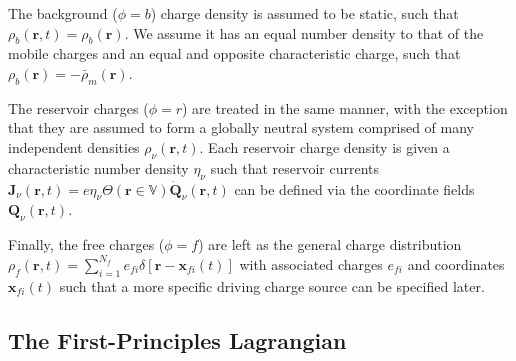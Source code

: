 \documentclass{article}
\begin{document}
The background ($\phi = b$) charge density is assumed to be static, such that $\rho_b(\mathbf{r},t) = \rho_b(\mathbf{r})$. We assume it has an equal number density to that of the mobile charges and an equal and opposite characteristic charge, such that $\rho_b(\mathbf{r}) = -\bar{\rho}_m(\mathbf{r})$.

The reservoir charges ($\phi = r$) are treated in the same manner, with the exception that they are assumed to form a globally neutral system comprised of many independent densities $\rho_\nu(\mathbf{r},t)$. Each reservoir charge density is given a characteristic number density $\eta_\nu$  such that reservoir currents $\mathbf{J}_\nu(\mathbf{r},t) = e\eta_\nu\Theta(\mathbf{r}\in\mathbb{V})\dot{\mathbf{Q}}_\nu(\mathbf{r},t)$ can be defined via the coordinate fields $\mathbf{Q}_\nu(\mathbf{r},t)$.

Finally, the free charges ($\phi = f$) are left as the general charge distribution $\rho_f(\mathbf{r},t) = \sum_{i = 1}^{N_f}e_{fi}\delta[\mathbf{r} - \mathbf{x}_{fi}(t)]$ with associated charges $e_{fi}$ and coordinates $\mathbf{x}_{fi}(t)$ such that a more specific driving charge source can be specified later.












\subsection{The First-Principles Lagrangian}\label{sec:LagrangianExpansion}
\end{document}
